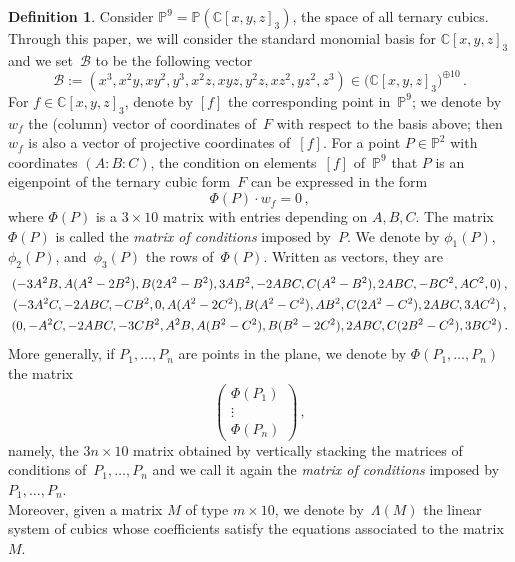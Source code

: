 \documentclass{amsart}
\theoremstyle{plain}
\theoremstyle{definition}
\newtheorem{definition}[lemma]{Definition}
\newcommand{\C}{\mathbb{C}}
\newcommand{\p}{\mathbb{P}}
\newcommand\scalemath[2]{\scalebox{#1}{\mbox{\ensuremath{\displaystyle #2}}}}
\begin{document}
\begin{definition}
\label{definition:matrix_conditions}
Consider $\p^9 = \p(\C[x,y,z]_3)$, the space of all ternary cubics.
Through this paper, we will consider the standard monomial basis for $\C[x,y,z]_3$ and we set~$\mathcal{B}$ to be the following vector
%
\begin{equation}
\label{eq:vector_basis}
  \mathcal{B} := (x^3, x^2 y, x y^2, y^3, x^2 z, x y z, y^2 z, x z^2, y z^2, z^3)
  \in \bigl( \C[x,y,z]_3 \bigr)^{\oplus 10} \,.
\end{equation}
For $f \in \C[x,y,z]_3$, denote by $[f]$ the corresponding point in~$\p^9$; we denote by $w_f$ the (column) vector of coordinates of~$F$ with respect to the basis above; then $w_f$ is also a vector of projective coordinates of~$[f]$.
For a point $P \in \p^2$ with coordinates $(A: B: C)$, the condition on elements~$[f]$ of~$\p^9$ that $P$ is an eigenpoint of the ternary cubic form~$F$ can be expressed in the form
%
\[
  \Phi(P) \cdot w_f = 0 \,,
\]
%
where $\Phi(P)$ is a $3 \times 10$ matrix with entries depending on $A, B, C$.
The matrix $\Phi(P)$ is called the \emph{matrix of conditions} imposed by~$P$.
We denote by $\phi_1(P)$, $\phi_2(P)$, and~$\phi_3(P)$ the rows of~$\Phi(P)$.
Written as vectors, they are
%
\begin{equation}
\label{equation:matrix_conditions_rows}
  \begin{gathered}
    \scalemath{0.9}{(-3A^2B, A(A^2 - 2B^2), B(2A^2 - B^2), 3AB^2,
     -2ABC, C(A^2 - B^2), 2 ABC,
     -B C^2, A C^2, 0)} \,, \\
    \scalemath{0.9}{(-3A^2 C,
     -2ABC,
     -CB^2,
     0,
     A(A^2-2C^2),
     B(A^2 - C^2),
     AB^2,
     C(2A^2-C^2),
     2ABC,
     3AC^2)} \,,\\
    \scalemath{0.9}{(0,
     -A^2C,
     -2ABC,
     -3CB^2,
     A^2 B,
     A(B^2 - C^2),
     B(B^2-2C^2),
     2ABC,
     C(2B^2-C^2),
     3BC^2)} \,.
  \end{gathered}
\end{equation}
%
More generally, if $P_1, \dotsc, P_n$ are points in the plane, we denote by $\Phi(P_1, \dotsc, P_n)$ the matrix
%
\[
  \left(
  \begin{array}{c}
    \Phi(P_1) \\
    \vdots \\
    \Phi(P_n)
  \end{array}
  \right) \,,
\]
%
namely, the $3n \times 10$ matrix obtained by vertically stacking the
matrices of conditions of~$P_1, \dotsc, P_n$ and we call it again the
\emph{matrix of conditions} imposed by $P_1, \dotsc, P_n$. \\
Moreover, given a matrix $M$ of type $m \times 10$, we denote by~$\Lambda(M)$ the linear system of cubics whose coefficients
satisfy the equations associated to the matrix~$M$.
\end{definition}
\end{document}
